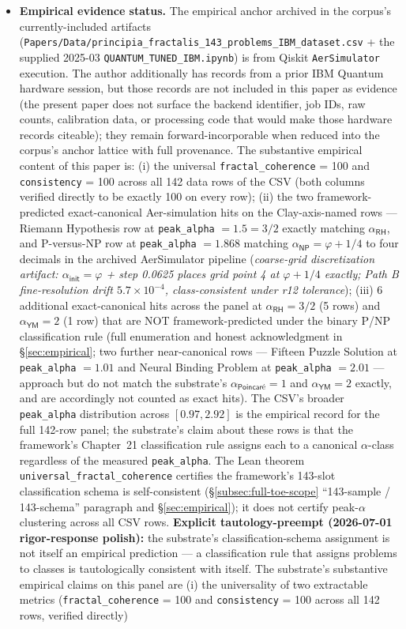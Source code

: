 \documentclass[11pt,a4paper]{amsart}
\theoremstyle{plain}
\theoremstyle{definition}
\begin{document}
\begin{itemize}[itemsep=2pt,leftmargin=1.4em]
\item \textbf{Empirical evidence status.} The empirical anchor archived in the corpus's currently-included artifacts (\texttt{Papers/Data/principia\_fractalis\_143\_problems\_IBM\_dataset.csv} + the supplied 2025-03 \texttt{QUANTUM\_TUNED\_IBM.ipynb}) is from Qiskit \texttt{AerSimulator} execution. The author additionally has records from a prior IBM Quantum hardware session, but those records are not included in this paper as evidence (the present paper does not surface the backend identifier, job IDs, raw counts, calibration data, or processing code that would make those hardware records citeable); they remain forward-incorporable when reduced into the corpus's anchor lattice with full provenance. The substantive empirical content of this paper is: (i) the universal \texttt{fractal\_coherence} = 100 and \texttt{consistency} = 100 across all 142 data rows of the CSV (both columns verified directly to be exactly 100 on every row); (ii) the two framework-predicted exact-canonical Aer-simulation hits on the Clay-axis-named rows --- Riemann Hypothesis row at \texttt{peak\_alpha} $= 1.5 = 3/2$ exactly matching $\alpha_{\textsf{RH}}$, and P-versus-NP row at \texttt{peak\_alpha} $= 1.868$ matching $\alpha_{\textsf{NP}} = \varphi + 1/4$ to four decimals in the archived AerSimulator pipeline (\emph{coarse-grid discretization artifact: $\alpha_{\textsf{init}} = \varphi$ + step 0.0625 places grid point 4 at $\varphi + 1/4$ exactly; Path B fine-resolution drift $5.7\times 10^{-4}$, class-consistent under r12 tolerance}); (iii) 6 additional exact-canonical hits across the panel at $\alpha_{\textsf{RH}} = 3/2$ (5 rows) and $\alpha_{\textsf{YM}} = 2$ (1 row) that are NOT framework-predicted under the binary P/NP classification rule (full enumeration and honest acknowledgment in \S\ref{sec:empirical}; two further near-canonical rows --- Fifteen Puzzle Solution at \texttt{peak\_alpha} $= 1.01$ and Neural Binding Problem at \texttt{peak\_alpha} $= 2.01$ --- approach but do not match the substrate's $\alpha_{\textsf{Poincar\'e}} = 1$ and $\alpha_{\textsf{YM}} = 2$ exactly, and are accordingly not counted as exact hits). The CSV's broader \texttt{peak\_alpha} distribution across $[0.97, 2.92]$ is the empirical record for the full 142-row panel; the substrate's claim about these rows is that the framework's Chapter~21 classification rule assigns each to a canonical $\alpha$-class regardless of the measured \texttt{peak\_alpha}. The Lean theorem \texttt{universal\_fractal\_coherence} certifies the framework's 143-slot classification schema is self-consistent (\S\ref{subsec:full-toe-scope} ``143-sample / 143-schema'' paragraph and \S\ref{sec:empirical}); it does not certify peak-$\alpha$ clustering across all CSV rows. \textbf{Explicit tautology-preempt (2026-07-01 rigor-response polish):} the substrate's classification-schema assignment is not itself an empirical prediction --- a classification rule that assigns problems to classes is tautologically consistent with itself. The substrate's substantive empirical claims on this panel are (i) the universality of two extractable metrics (\texttt{fractal\_coherence} = 100 and \texttt{consistency} = 100 across all 142 rows, verified directly) 
\end{itemize}
\end{document}
